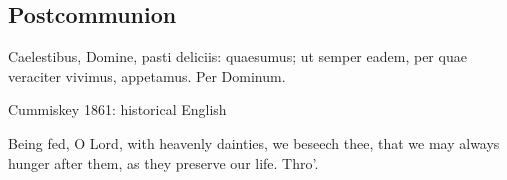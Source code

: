\subsection{Postcommunion}

\label{proper-postcommunion}


\begin{latinproper}

Caelestibus, Domine, pasti deliciis: quaesumus; ut semper eadem, per quae veraciter vivimus, appetamus. Per Dominum.

\end{latinproper}

\begin{englishwitness}{Cummiskey 1861: historical English}

Being fed, O Lord, with heavenly dainties, we beseech thee, that we may always hunger after them, as they preserve our life. Thro’.

\end{englishwitness}


